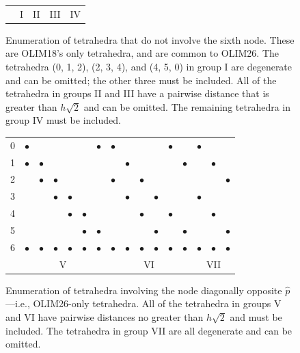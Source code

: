 \documentclass[eikonal.tex]{subfiles}
\begin{document}
\begin{figure}[h]
\begin{tabular}{c|cccccc|cccccc|cccccc|cc}
    \multicolumn{1}{c}{} & \multicolumn{6}{c}{I} & \multicolumn{6}{c}{II} & \multicolumn{6}{c}{III} & \multicolumn{2}{c}{IV}
  \end{tabular}
  \caption{Enumeration of tetrahedra that do not involve the sixth
    node. These are OLIM18's only tetrahedra, and are common to
    OLIM26. The tetrahedra (0, 1, 2), (2, 3, 4), and (4, 5, 0) in
    group I are degenerate and can be omitted; the other three must be
    included. All of the tetrahedra in groups II and III have a
    pairwise distance that is greater than $h \sqrt{2}$ and can be
    omitted. The remaining tetrahedra in group IV must be
    included.}\label{fig:olim18-tetrahedra}
  \vspace{1em}
  \begin{tabular}{c|cccccc|cccccc|ccc}
    0 & $\bullet$ & & & & & $\bullet$ & $\bullet$ & & & & $\bullet$ & & $\bullet$ & & \\
    1 & $\bullet$ & $\bullet$ & & & & & & $\bullet$ & & & & $\bullet$ & & $\bullet$ & \\
    2 & & $\bullet$ & $\bullet$ & & & & $\bullet$ & & $\bullet$ & & & & & & $\bullet$ \\
    3 & & & $\bullet$ & $\bullet$ & & & & $\bullet$ & & $\bullet$ & & & $\bullet$ & & \\
    4 & & & & $\bullet$ & $\bullet$ & & & & $\bullet$ & & $\bullet$ & & & $\bullet$ & \\
    5 & & & & & $\bullet$ & $\bullet$ & & & & $\bullet$ & & $\bullet$ & & & $\bullet$ \\
    6 & $\bullet$ & $\bullet$ & $\bullet$ & $\bullet$ & $\bullet$ & $\bullet$ & $\bullet$ & $\bullet$ & $\bullet$ & $\bullet$ & $\bullet$ & $\bullet$ & $\bullet$ & $\bullet$ & $\bullet$ \\
    \multicolumn{1}{c}{} & \multicolumn{6}{c}{V} & \multicolumn{6}{c}{VI} & \multicolumn{3}{c}{VII}
  \end{tabular}
  \caption{Enumeration of tetrahedra involving the node diagonally
    opposite $\hat{p}$---i.e., OLIM26-only tetrahedra. All of the
    tetrahedra in groups V and VI have pairwise distances no greater
    than $h \sqrt{2}$ and must be included. The tetrahedra in group
    VII are all degenerate and can be
    omitted.}\label{fig:olim26-tetrahedra}
\end{figure}
\end{document}
